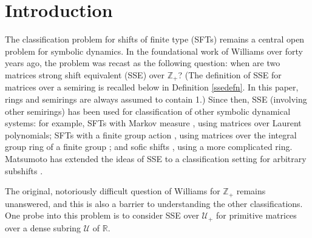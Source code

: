 \documentclass{amsart}
\theoremstyle{definition}
\theoremstyle{remark}
\numberwithin{equation}{section}
\begin{document}
\section{Introduction}


The classification problem for shifts of finite type (SFTs)
 remains a central open problem 
for symbolic dynamics.  
In the foundational work of Williams \cite{Wi,Wi2}
over forty years ago, 
the problem was recast as the following question: 
when are two matrices strong shift equivalent (SSE) over 
$\mathbb Z_+$? 
(The definition of SSE for matrices over a semiring is recalled below 
in Definition \ref{ssedefn}.
In this paper, rings and semirings are always assumed to contain 
1.)
Since then, SSE (involving other semirings) has been used for 
classification of other symbolic dynamical systems: for example, 
SFTs with Markov measure \cite{MT}, using matrices over Laurent 
polynomials; SFTs with a finite group action 
\cite{FN},
using matrices over the integral group ring of a finite group
\cite{BS}; and  
sofic shifts \cite{BK1,HN,KR1}, using a more complicated ring. 
Matsumoto has extended the ideas of SSE to a 
classification  setting for arbitrary subshifts \cite{Mat1,Mat2}. 

The original, notoriously difficult question of Williams 
for $\mathbb Z_+$ remains unanswered, 
and this is also 
a barrier to understanding the other classifications. 
One probe into this problem is to consider SSE over $\mathcal U_+$
for primitive matrices over a dense subring $\mathcal U$ 
of $\mathbb R$. 


\end{document}
